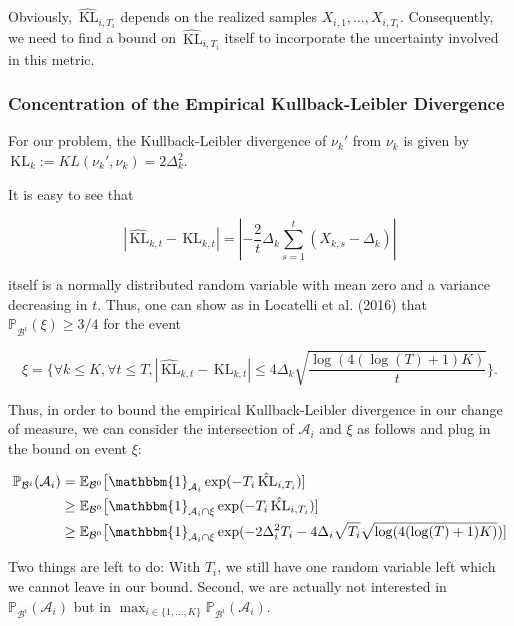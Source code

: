 \documentclass[12pt,]{article}
\newcommand{\KL}{\,\text{KL}}
\begin{document}
Obviously, \(\hat{\KL}_{i,T_i}\) depends on the realized samples
\(X_{i,1}, \dots,X_{i,T_i}\). Consequently, we need to find a bound on
\(\hat{\KL}_{i,T_i}\) itself to incorporate the uncertainty involved in
this metric.

\subsubsection{Concentration of the Empirical Kullback-Leibler
Divergence}\label{concentration-of-the-empirical-kullback-leibler-divergence}

For our problem, the Kullback-Leibler divergence of \(\nu_k'\) from
\(\nu_k\) is given by \(\KL_k := KL(\nu_k', \nu_k) = 2\Delta_k^2\).

It is easy to see that

\begin{equation*}
|\hat{\KL}_{k,t} - \KL_{k,t}| = |-\frac{2}{t} \Delta_k \sum_{s=1}^{t}(X_{k,s} - \Delta_k)|
\end{equation*}

itself is a normally distributed random variable with mean zero and a
variance decreasing in \(t\). Thus, one can show as in Locatelli et al.
(2016) that \(\mathbb{P}_{\mathcal{B}^i}(\xi) \geq 3/4\) for the event

\begin{equation}
\xi = \{ \forall k \leq K, \forall t \leq T, |\hat{\KL}_{k,t} - \KL_{k,t}| \leq 4 \Delta_k \sqrt{\frac{\log(4(\log(T)+1)K)}{t}}\}. \label{LocatelliTheorem1EventXi}
\end{equation}

Thus, in order to bound the empirical Kullback-Leibler divergence in our
change of measure, we can consider the intersection of \(\mathcal{A}_i\)
and \(\xi\) as follows and plug in the bound on event \(\xi\):

\begin{align*}
\mathbb{P}_{\mathcal{B}^i}(\mathcal{A}_i) & = \mathbb{E}_{\mathcal{B}^0} \big[\mathbbm{1}_{\mathcal{A}_i} \exp (- T_i \hat{\KL}_{i,T_i}) ] \\
& \geq \mathbb{E}_{\mathcal{B}^0} \big[\mathbbm{1}_{\mathcal{A}_i \cap \xi} \exp (- T_i \hat{\KL}_{i,T_i}) ] \\
& \geq \mathbb{E}_{\mathcal{B}^0} \big[\mathbbm{1}_{\mathcal{A}_i \cap \xi} \exp (- 2 \Delta_i^2 T_i - 4 \Delta_i \sqrt{T_i} \sqrt{\log(4(\log(T)+1)K)}) ]
\end{align*}

Two things are left to do: With \(T_i\), we still have one random
variable left which we cannot leave in our bound. Second, we are
actually not interested in \(\mathbb{P}_{\mathcal{B}^i}(\mathcal{A}_i)\)
but in
\(\max_{i \in \{1,\dots,K\}} \mathbb{P}_{\mathcal{B}^i}(\mathcal{A}_i)\).
\end{document}
